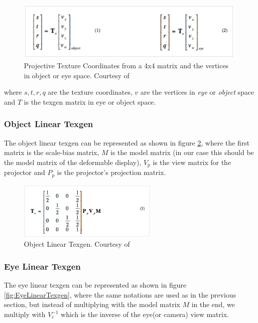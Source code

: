 \documentclass[]{article}
\begin{document}
\begin{figure}[hbtp]
    \centering
    \includegraphics[width=1.0\textwidth]{figures/PTMCoordinates.PNG}
    \caption{Projective Texture Coordinates from a 4x4 matrix and the vertices in object or eye space. Courtesy of \cite{cassNvidia}}
    \label{fig:ProjectiveTextureMapping}
\end{figure}

where $s, t, r, q$ are the texture coordinates, $v$ are the vertices in \textit{eye} or \textit{object} space and $T$ is the texgen matrix in eye or object space.

\subsubsection{Object Linear Texgen}

The object linear texgen can be represented as shown in figure \ref{fig:ObjectLinearTexgen}, where the first matrix is the scale-bias matrix, $M$ is the model matrix (in our case this should be the model matrix of the deformable display), $V_{p}$ is the view matrix for the projector and $P_{p}$ is the projector's projection matrix.

\begin{figure}[hbtp]
    \centering
    \includegraphics[width=0.6\textwidth]{figures/ObjectLinearTexgen.PNG}
    \caption{Object Linear Texgen. Courtesy of \cite{cassNvidia}}
    \label{fig:ObjectLinearTexgen}
\end{figure}

\subsubsection{Eye Linear Texgen}

The eye linear texgen can be represented as shown in figure \ref{fig:EyeLinearTexgen}, where the same notations are used as in the previous section, but instead of multiplying with the model matrix $M$ in the end, we multiply with $V^{-1}_{e}$ which is the inverse of the eye(or camera) view matrix.
\end{document}
